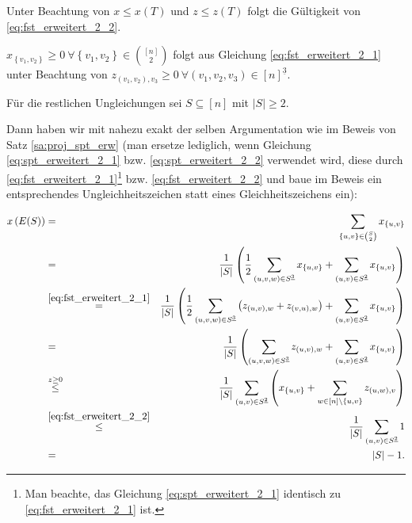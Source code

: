 \documentclass[10p,a4paper,BCOR = 12mm, DIV=15]{scrbook}
\begin{document}
{\begin{bew}
Unter Beachtung von $x \leq x\left(T\right)$ und $z \leq z\left(T\right)$ folgt die Gültigkeit von \eqref{eq:fst_erweitert_2_2}.

$x_{\left\{v_1, v_2\right\}} \geq 0 \ \forall \left\{v_1, v_2\right\} \in {\left[n\right] \choose 2}$ folgt aus Gleichung \eqref{eq:fst_erweitert_2_1} unter Beachtung von $z_{\left(v_1, v_2\right), v_3} \geq 0 \ \forall \left(v_1, v_2, v_3\right) \in \left[n\right]^{\underline{3}}$.

Für die restlichen Ungleichungen sei $S \subseteq \left[n\right]$ mit $\left|S\right| \geq 2$.

Dann haben wir mit nahezu exakt der selben Argumentation wie im Beweis von Satz \ref{sa:proj_spt_erw} (man ersetze lediglich, wenn Gleichung \eqref{eq:spt_erweitert_2_1} bzw. \eqref{eq:spt_erweitert_2_2} verwendet wird, diese durch \eqref{eq:fst_erweitert_2_1}\footnote{Man beachte, das Gleichung \eqref{eq:spt_erweitert_2_1} identisch zu \eqref{eq:fst_erweitert_2_1} ist.} bzw. \eqref{eq:fst_erweitert_2_2} und baue im Beweis ein entsprechendes Ungleichheitszeichen statt eines Gleichheitszeichens ein):

{
\allowdisplaybreaks
\begin{eqnarray*}
x\left(E(S)\right) & = & \sum_{\left\{u, v\right\} \in {S \choose 2}} x_{\left\{u, v\right\}} \\
& = & \frac{1}{\left|S\right|} \left(\frac{1}{2} \sum_{\left(u, v, w\right) \in S^{\underline{3}}} x_{\left\{u, v\right\}} + \sum_{\left(u, v\right) \in S^{\underline{2}}} x_{\left\{u, v\right\}} \right) \\
& \stackrel{\eqref{eq:fst_erweitert_2_1}}{=} & \frac{1}{\left|S\right|} \left(\frac{1}{2} \sum_{\left(u, v, w\right) \in S^{\underline{3}}} \left(z_{\left(u, v\right), w} + z_{\left(v, u\right), w}\right) + \sum_{\left(u, v\right) \in S^{\underline{2}}} x_{\left\{u, v\right\}} \right) \\
& = & \frac{1}{\left|S\right|} \left(\sum_{\left(u, v, w\right) \in S^{\underline{3}}} z_{\left(u, v\right), w} + \sum_{\left(u, v\right) \in S^{\underline{2}}} x_{\left\{u, v\right\}} \right) \\
& \stackrel{z \geq 0}{\leq} & \frac{1}{\left|S\right|} \sum_{\left(u, v\right) \in S^{\underline{2}}} \left( x_{\left\{u, v\right\}} + \sum_{w \in \left[n\right] \backslash \left\{u, v\right\}} z_{\left(u, w\right), v} 
\right) \\
& \stackrel{\eqref{eq:fst_erweitert_2_2}}{\leq} & \frac{1}{\left|S\right|} \sum_{\left(u, v\right) \in S^{\underline{2}}} 1 \\
& = & \left|S\right|-1.
\end{eqnarray*}
}
\end{bew}

}
\end{document}
